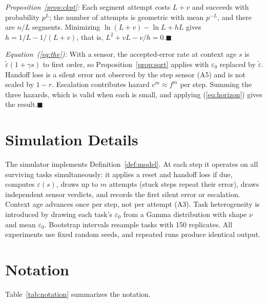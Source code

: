 \documentclass[journal]{IEEEtran}
\newcommand{\et}{\tilde{\varepsilon}}
\begin{document}
\emph{Proposition~\ref{prop:ckpt}:} Each segment attempt costs $L+v$ and succeeds with probability $p^L$; the number of attempts is geometric with mean $p^{-L}$, and there are $n/L$ segments. Minimizing $\ln(L+v)-\ln L+hL$ gives $h=1/L-1/(L+v)$, that is, $L^2+vL-v/h=0$.\hfill$\blacksquare$

\emph{Equation~(\ref{eq:the}):} With a sensor, the accepted-error rate at context age $s$ is $\et(1+\gamma s)$ to first order, so Proposition~\ref{prop:sqrt} applies with $\varepsilon_0$ replaced by $\et$. Handoff loss is a silent error not observed by the step sensor (A5) and is not scaled by $1-r$. Escalation contributes hazard $c^m\approx f^m$ per step. Summing the three hazards, which is valid when each is small, and applying (\ref{eq:horizon}) gives the result.\hfill$\blacksquare$

\section{Simulation Details}\label{app:sim}
The simulator implements Definition~\ref{def:model}. At each step it operates on all surviving tasks simultaneously: it applies a reset and handoff loss if due, computes $\varepsilon(s)$, draws up to $m$ attempts (stuck steps repeat their error), draws independent sensor verdicts, and records the first silent error or escalation. Context age advances once per step, not per attempt (A3). Task heterogeneity is introduced by drawing each task's $\varepsilon_0$ from a Gamma distribution with shape $\nu$ and mean $\varepsilon_0$. Bootstrap intervals resample tasks with 150 replicates. All experiments use fixed random seeds, and repeated runs produce identical output.

\section{Notation}\label{app:notation}
Table~\ref{tab:notation} summarizes the notation.
\end{document}
